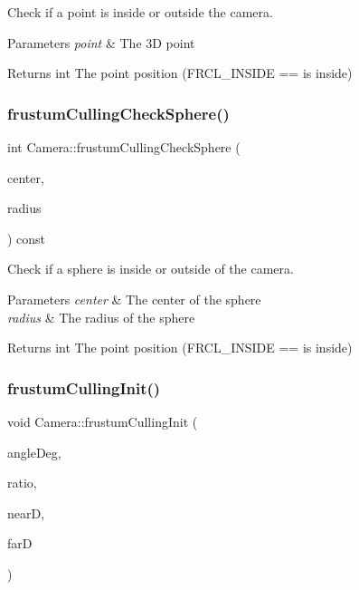 Check if a point is inside or outside the camera. 


\begin{DoxyParams}{Parameters}
{\em point} & The 3D point \\
\hline
\end{DoxyParams}
\begin{DoxyReturn}{Returns}
int The point position (F\+R\+C\+L\+\_\+\+I\+N\+S\+I\+DE == is inside) 
\end{DoxyReturn}
\mbox{\label{class_camera_a2be9694e31b56ae806836a81844ad1bb}} 
\subsubsection{\texorpdfstring{frustum\+Culling\+Check\+Sphere()}{frustumCullingCheckSphere()}}
{\footnotesize\ttfamily int Camera\+::frustum\+Culling\+Check\+Sphere (\begin{DoxyParamCaption}\item[{C\+A\+M\+E\+R\+A\+\_\+\+V\+E\+C3 const \&}]{center,  }\item[{C\+A\+M\+E\+R\+A\+\_\+\+F\+L\+O\+AT}]{radius }\end{DoxyParamCaption}) const}



Check if a sphere is inside or outside of the camera. 


\begin{DoxyParams}{Parameters}
{\em center} & The center of the sphere \\
\hline
{\em radius} & The radius of the sphere \\
\hline
\end{DoxyParams}
\begin{DoxyReturn}{Returns}
int The point position (F\+R\+C\+L\+\_\+\+I\+N\+S\+I\+DE == is inside) 
\end{DoxyReturn}
\mbox{\label{class_camera_a4287af0eacc2cf50765360a8e1b5db74}} 
\subsubsection{\texorpdfstring{frustum\+Culling\+Init()}{frustumCullingInit()}}
{\footnotesize\ttfamily void Camera\+::frustum\+Culling\+Init (\begin{DoxyParamCaption}\item[{C\+A\+M\+E\+R\+A\+\_\+\+F\+L\+O\+AT}]{angle\+Deg,  }\item[{C\+A\+M\+E\+R\+A\+\_\+\+F\+L\+O\+AT}]{ratio,  }\item[{C\+A\+M\+E\+R\+A\+\_\+\+F\+L\+O\+AT}]{nearD,  }\item[{C\+A\+M\+E\+R\+A\+\_\+\+F\+L\+O\+AT}]{farD }\end{DoxyParamCaption})}



